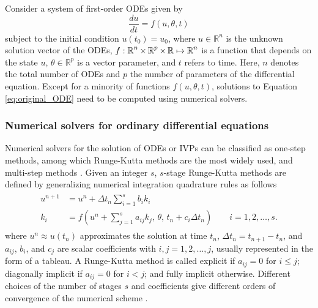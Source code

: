 Consider a system of first-order ODEs given by
\begin{equation}
 \frac{du}{dt} = f(u, \theta, t)
 \label{eq:original_ODE}
\end{equation}
subject to the initial condition $u(t_0) = u_0$, where $u \in \mathbb{R}^n$ is the unknown solution vector of the ODEs, $f: \operatorname{\mathbb{R}}^n \times \operatorname{\mathbb{R}}^p \times \operatorname{\mathbb{R}} \mapsto \operatorname{\mathbb{R}}^n$ is a function that depends on the state $u$, $\theta \in \mathbb R^p$ is a vector parameter, and $t$ refers to time.
Here, $n$ denotes the total number of ODEs and $p$ the number of parameters of the differential equation.
Except for a minority of functions $f(u,\theta, t)$, solutions to Equation \eqref{eq:original_ODE} need to be computed using numerical solvers. 

\subsubsection{Numerical solvers for ordinary differential equations}
\label{section:intro-numerical-solvers}

Numerical solvers for the solution of ODEs or IVPs can be classified as one-step methods, among which Runge-Kutta methods are the most widely used, and multi-step methods \cite{hairer-solving-1}.
Given an integer $s$, $s$-stage Runge-Kutta methods are defined by generalizing numerical integration quadrature rules as follows
\begin{align}
\begin{split}
    u^{n+1} 
    &= 
    u^n 
    + 
    \Delta t_n \sum_{i=1}^s b_i k_i \\
    k_i 
    &= 
    f \left(u^n + \sum_{j=1}^s a_{ij} k_j , \, \theta , \, t_n + c_i \Delta t_n \right) \qquad i=1,2, \ldots, s.
    \label{eq:Runge-Kutta-scheme}
\end{split}
\end{align}
where $u^{n} \approx u(t_n)$ approximates the solution at time $t_n$, $\Delta t_n = t_{n+1}-t_n$, and $a_{ij}$, $b_i$, and $c_j$ are scalar coefficients with $i,j=1, 2,\ldots, j$, usually represented in the form of a tableau. 
A Runge-Kutta method is called explicit if $a_{ij}=0$ for $i \leq j$; diagonally implicit if $a_{ij}=0$ for $i < j$; and fully implicit otherwise. 
Different choices of the number of stages $s$ and coefficients give different orders of convergence of the numerical scheme \cite{Butcher_Wanner_1996, Butcher_2001}. 


